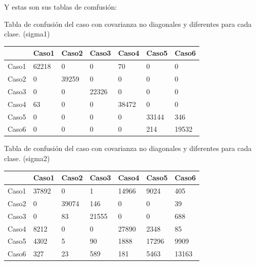 \documentclass[a4paper,10pt]{article}
\begin{document}
Y estas son sus tablas de comfusi\'on:

Tabla de confusi\'on del caso con covarianza no diagonales y diferentes para cada clase. (sigma1)\newline

\begin{tabular}{| l | l | l | l | l | l | l |} 
& Caso1 & Caso2 & Caso3 & Caso4 & Caso5 & Caso6\\ \hline
Caso1 &     62218&           0      &     0 &         70      &     0&           0\\ \hline
Caso2 &           0 &      39259     &      0  &         0     &      0 &          0\\ \hline
Caso3 &           0  &         0    &   22326   &        0    &       0  &         0\\ \hline
Caso4 &          63   &        0   &        0    &   38472   &        0   &        0\\ \hline
Caso5 &           0    &       0  &         0     &      0  &     33144    &     346\\ \hline
Caso6 &           0     &      0 &          0      &     0 &        214     &  19532\\ \hline
\end{tabular}\newline

Tabla de confusi\'on del caso con covarianza no diagonales y diferentes para cada clase. (sigma2)\newline

\begin{tabular}{| l | l | l | l | l | l | l | }
& Caso1 & Caso2 & Caso3 & Caso4 & Caso5 & Caso6\\ \hline
Caso1 &	37892&           0     &      1&       14966    &    9024&         405\\ \hline
Caso2 &           0  &     39074     &    146  &         0    &       0  &        39\\ \hline
Caso3 &           0   &       83    &   21555   &        0   &        0   &      688\\ \hline
Caso4 &        8212    &       0   &        0    &   27890  &      2348    &      85\\ \hline
Caso5 &        4302     &      5  &        90     &   1888 &      17296     &   9909\\ \hline
Caso6 &         327      &    23 &        589      &   181&        5463      & 13163\\ \hline

\end{tabular}
\end{document}
